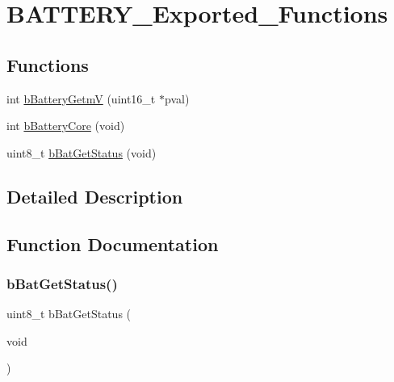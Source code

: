 \hypertarget{group___b_a_t_t_e_r_y___exported___functions}{}\section{B\+A\+T\+T\+E\+R\+Y\+\_\+\+Exported\+\_\+\+Functions}
\label{group___b_a_t_t_e_r_y___exported___functions}
\subsection*{Functions}
\begin{DoxyCompactItemize}
\item 
int \mbox{\hyperlink{group___b_a_t_t_e_r_y___exported___functions_ga9cf8ea102fa7468761080bd9a1554de5}{b\+Battery\+GetmV}} (uint16\+\_\+t $\ast$pval)
\item 
int \mbox{\hyperlink{group___b_a_t_t_e_r_y___exported___functions_gafd10a1af74782220922eed6542324cd2}{b\+Battery\+Core}} (void)
\item 
uint8\+\_\+t \mbox{\hyperlink{group___b_a_t_t_e_r_y___exported___functions_ga3e81a4104d71480276a029d7ce1169c2}{b\+Bat\+Get\+Status}} (void)
\end{DoxyCompactItemize}


\subsection{Detailed Description}


\subsection{Function Documentation}
\mbox{\label{group___b_a_t_t_e_r_y___exported___functions_ga3e81a4104d71480276a029d7ce1169c2}} 
\subsubsection{\texorpdfstring{b\+Bat\+Get\+Status()}{bBatGetStatus()}}
{\footnotesize\ttfamily uint8\+\_\+t b\+Bat\+Get\+Status (\begin{DoxyParamCaption}\item[{void}]{ }\end{DoxyParamCaption})}

